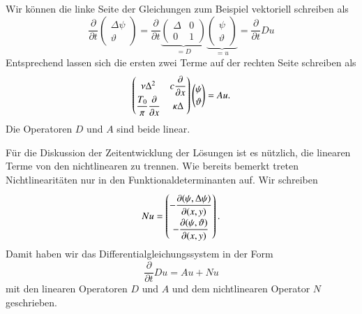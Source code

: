 Wir können die linke Seite der Gleichungen zum Beispiel vektoriell schreiben
als
\[
\frac{\partial}{\partial t}
\begin{pmatrix}
\Delta\psi\\\vartheta
\end{pmatrix}
=
\frac{\partial}{\partial t}
\underbrace{
\begin{pmatrix}
\Delta &  0 \\
   0   &  1
\end{pmatrix}
}_{\displaystyle=D}
\underbrace{
\begin{pmatrix}
\psi\\\vartheta
\end{pmatrix}
}_{\displaystyle=u}
=
\frac{\partial}{\partial t} Du
\]
Entsprechend lassen sich die ersten zwei Terme auf der rechten Seite 
schreiben als
\[
\def\arraystretch{1.1}
\begin{pmatrix}
\nu\Delta^2     & \displaystyle c\frac{\partial}{\partial x}\\
\displaystyle \frac{T_0}{\pi}\frac{\partial}{\partial x}    &\kappa\Delta
\end{pmatrix}
\begin{pmatrix}
\psi\\\vartheta
\end{pmatrix}
=
Au.
\]
Die Operatoren $D$ und $A$ sind beide linear.

Für die Diskussion der Zeitentwicklung der Lösungen ist es nützlich,
die linearen Terme von den nichtlinearen zu trennen.
Wie bereits bemerkt treten Nichtlinearitäten nur in den
Funktionaldeterminanten auf.
Wir schreiben
\[
Nu
=
\def\arraystretch{1.9}
\begin{pmatrix}
\displaystyle
-\frac{\partial(\psi,\Delta\psi)}{\partial(x,y)}\\
\displaystyle
-\frac{\partial(\psi,\vartheta)}{\partial(x,y)}
\end{pmatrix}.
\]
Damit haben wir das Differentialgleichungssystem in der Form
\begin{equation}
\frac{\partial}{\partial t}Du
=
Au+Nu
\label{skript:allgemeinesmodell}
\end{equation}
mit den linearen Operatoren $D$ und $A$ und dem nichtlinearen Operator
$N$ geschrieben.

